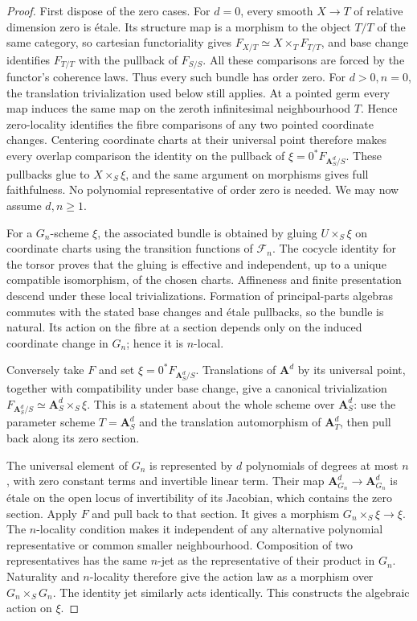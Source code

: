 \begin{proof}
First dispose of the zero cases. For $d=0$, every smooth $X\to T$ of
relative dimension zero is \'etale. Its structure map is a morphism to
the object $T/T$ of the same category, so cartesian functoriality gives
$F_{X/T}\simeq X\times_TF_{T/T}$, and base change identifies $F_{T/T}$
with the pullback of $F_{S/S}$. All these comparisons are forced by the
functor's coherence laws. Thus every such bundle has order zero.
For $d>0,n=0$, the translation trivialization used below still applies.
At a pointed germ every map induces the same map on the zeroth
infinitesimal neighbourhood $T$. Hence zero-locality identifies the fibre
comparisons of any two pointed coordinate changes. Centering coordinate
charts at their universal point therefore makes every overlap comparison
the identity on the pullback of $\xi=0^*F_{\mathbf A^d_S/S}$.
These pullbacks glue to $X\times_S\xi$, and the same argument on morphisms
gives full faithfulness. No polynomial representative of order zero is
needed. We may now assume $d,n\geq1$.

For a $G_n$-scheme $\xi$, the associated bundle is obtained by gluing
$U\times_S\xi$ on coordinate charts using the transition functions of
$\mathcal F_n$. The cocycle identity for the torsor proves that the gluing
is effective and independent, up to a unique compatible isomorphism, of the
chosen charts. Affineness and finite presentation descend under these local
trivializations. Formation of principal-parts algebras commutes with the
stated base changes and \'{e}tale pullbacks, so the bundle is natural.
Its action on the fibre at a section depends only on the induced coordinate
change in $G_n$; hence it is $n$-local.

Conversely take $F$ and set $\xi=0^*F_{\mathbf A^d_S/S}$. Translations of
$\mathbf A^d$ by its universal point, together with compatibility under
base change, give a canonical trivialization
$F_{\mathbf A^d_S/S}\simeq\mathbf A^d_S\times_S\xi$. This is a statement
about the whole scheme over $\mathbf A^d_S$: use the parameter scheme
$T=\mathbf A^d_S$ and the translation automorphism of $\mathbf A^d_T$,
then pull back along its zero section.

The universal element of $G_n$ is represented by $d$ polynomials of degrees
at most $n$, with zero constant terms and invertible linear term. Their map
$\mathbf A^d_{G_n}\to\mathbf A^d_{G_n}$ is \'{e}tale on the open locus of
invertibility of its Jacobian, which contains the zero section. Apply $F$
and pull back to that section. It gives a morphism
$G_n\times_S\xi\to\xi$. The $n$-locality condition makes it independent
of any alternative polynomial representative or common smaller
neighbourhood. Composition of two representatives has the same $n$-jet as
the representative of their product in $G_n$. Naturality and $n$-locality
therefore give the action law as a morphism over $G_n\times_S G_n$.
The identity jet similarly acts identically. This constructs the algebraic
action on $\xi$.


\end{proof}
